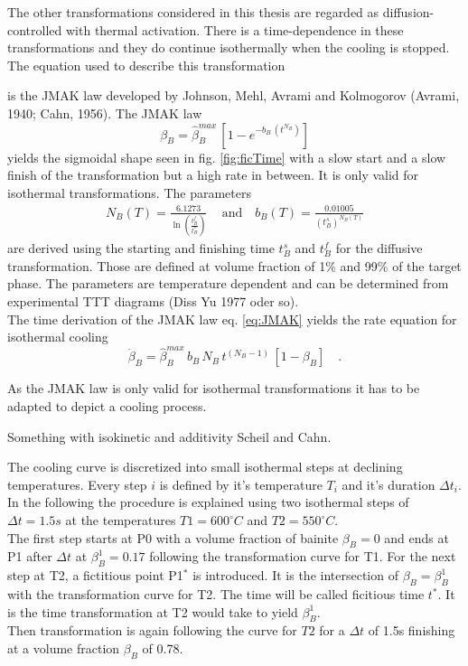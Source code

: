 The other transformations considered in this thesis are regarded as diffusion-controlled with thermal activation. There is a time-dependence in these transformations and they do continue isothermally when the cooling is stopped. \\
The equation used to describe this transformation 

is the JMAK law developed by Johnson, Mehl, Avrami and Kolmogorov (Avrami, 1940; Cahn, 1956). 
The JMAK law 
\begin{equation}
	\beta_B = \hat{\beta}_B^{max}\,[1-e^{-b_B\,(t^{N_B})}] \label{eq:JMAK}
\end{equation}
yields the sigmoidal shape seen in fig. \ref{fig:ficTime} with a slow start and a slow finish of the transformation but a high rate in between. It is only valid for isothermal transformations. 
The parameters 
\begin{align}
	N_B(T) = \frac{6.1273}{\ln(\frac{t_B^f}{t_B^s})}\,\quad \text{and} \quad b_B(T) = \frac{0.01005}{(t^s_B)^{N_B(T)}}
\end{align}
are derived using the starting and finishing time $t_B^s$ and $t_B^f$ for the diffusive transformation. Those are defined at volume fraction of 1\% and 99\% of the target phase. The parameters are temperature dependent and can be determined from experimental TTT diagrams (Diss Yu 1977 oder so). \\
The time derivation of the JMAK law eq. \ref{eq:JMAK} yields the rate equation for isothermal cooling
\begin{equation}
	\dot{\beta}_B = \hat{\beta}_B^{max}\,b_B\,N_B\,t^{(N_B-1)}\,[1-\beta_B] \quad. \label{eq:ABrate0}
\end{equation}


As the JMAK law is only valid for isothermal transformations it has to be adapted to depict a cooling process. 

Something with isokinetic and additivity Scheil and Cahn. 



The cooling curve is discretized into small isothermal steps at declining temperatures. Every step $i$ is defined by it's temperature $T_i$ and it's duration $\Delta t_i$. \\
In the following the procedure is explained using two isothermal steps of $\Delta t = 1.5s$ at the temperatures  $T1 = 600^\circ C$ and $T2 = 550^\circ C$. \\ 
The first step starts at P0 with a volume fraction of bainite 
$\beta_B = 0$ and ends at P1 after $\Delta t$ at $\beta_B^1 = 0.17$ following the transformation curve for T1.  
For the next step at T2, a fictitious point P1$^\ast$ is introduced. It is the intersection of $\beta_B = \beta_B^1$ with the transformation curve for T2. The time will be called ficitious time $t^\ast$. It is the time transformation at T2 would take to yield $\beta_B^1$.\\
Then transformation is again  following the curve for $T2$ for a $\Delta t$ of 1.5s finishing at a volume fraction $\beta_B$ of 0.78. \\


